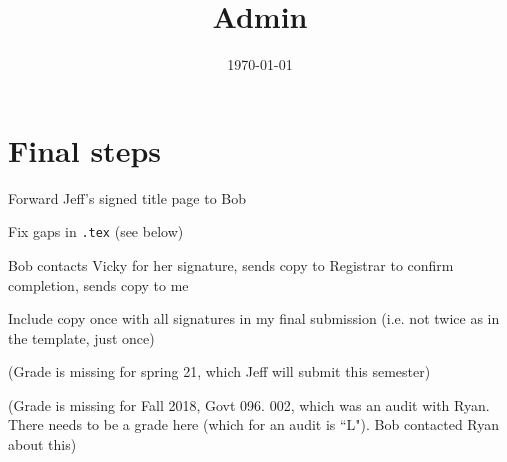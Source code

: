 \documentclass[12pt]{article}
\title{Admin}
\date{\today}
\begin{document}
\maketitle

\section*{Final steps}
	\begin{coi}
		\item Forward Jeff's signed title page to Bob
		\item Fix gaps in \texttt{.tex} (see below)
		\item Bob contacts Vicky for her signature, sends copy to Registrar to confirm completion, sends copy to me
		\item Include copy once with all signatures in my final submission (i.e. not twice as in the template, just once)
		\item (Grade is missing for spring 21, which Jeff will submit this semester)
		\item (Grade is missing for Fall 2018, Govt 096. 002, which was an audit with Ryan. There needs to be a grade here (which for an audit is ``L"). Bob contacted Ryan about this)


	\end{coi}

 
\end{document}
